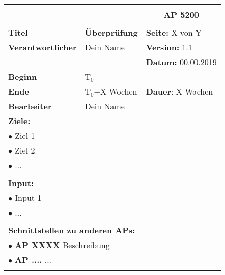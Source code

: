 \clearpage
\begin{table}[!h]
 \begin{center}
  \begin{tabular}{|p{35mm}||p{55mm}|p{50mm}||p{40mm}|}
   \hline
   \multicolumn{3}{|l||}{\textbf{}} & \multicolumn{1}{c|}{}\\
   \multicolumn{3}{|l||}{\textbf{}} & \multicolumn{1}{c|}{\textbf{AP 5200}}\\
   \multicolumn{3}{|l||}{\textbf{}} & \multicolumn{1}{c|}{}\\
   \hline\hline
   \textbf{Titel} & \multicolumn{2}{p{7cm}||}{\textbf{Überprüfung}} & \textbf{Seite:} X von Y\\
   \hline
   \textbf{Verantwortlicher} & \multicolumn{2}{l||}{Dein Name} & \textbf{Version:} 1.1\\
   \hline
   \multicolumn{3}{|l||}{} & \textbf{Datum:} 00.00.2019\\
   \hline\hline
   \textbf{Beginn} & \multicolumn{2}{l||}{T$_0$} & \\
   \hline
   \textbf{Ende} & \multicolumn{2}{l||}{T$_0$+X Wochen} & \textbf{Dauer}: X Wochen\\
   \hline\hline
   \textbf{Bearbeiter} & \multicolumn{3}{l|}{Dein Name}\\
   \hline\hline
   \multicolumn{4}{|p{150mm}|}{\textbf{Ziele:}}\\
   \multicolumn{4}{|p{150mm}|}{$\bullet$ Ziel 1}\\
   \multicolumn{4}{|p{150mm}|}{$\bullet$ Ziel 2}\\
   \multicolumn{4}{|p{150mm}|}{$\bullet$ ...}\\
   \multicolumn{4}{|p{150mm}|}{}\\
   \multicolumn{4}{|p{150mm}|}{\textbf{Input:}}\\
   \multicolumn{4}{|p{150mm}|}{$\bullet$ Input 1}\\
   \multicolumn{4}{|p{150mm}|}{$\bullet$ ...}\\
   \multicolumn{4}{|p{150mm}|}{}\\
   \multicolumn{4}{|p{150mm}|}{\textbf{Schnittstellen zu anderen APs:}}\\
   \multicolumn{4}{|p{150mm}|}{$\bullet$ \textbf{AP XXXX} Beschreibung}\\
   \multicolumn{4}{|p{150mm}|}{$\bullet$ \textbf{AP ....} ...}\\
   \multicolumn{4}{|p{150mm}|}{}\\

\end{tabular}
\end{center}
\end{table}
